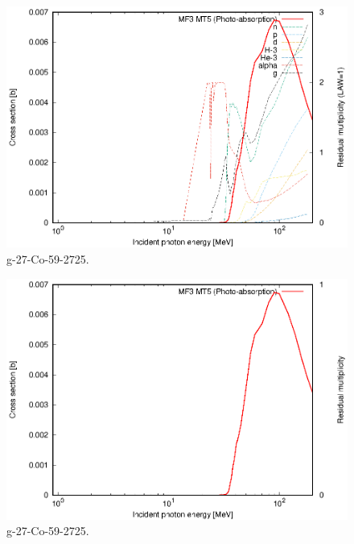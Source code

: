 \begin{figure}
 \includegraphics[width=\linewidth]{eps/g_27-Co-59_2725.eps}
  \caption{g-27-Co-59-2725.}
\end{figure}
\begin{figure}
 \includegraphics[width=\linewidth]{eps-law0/g_27-Co-59_2725.eps}
 \caption{g-27-Co-59-2725.}
\end{figure}
\newpage \clearpage

